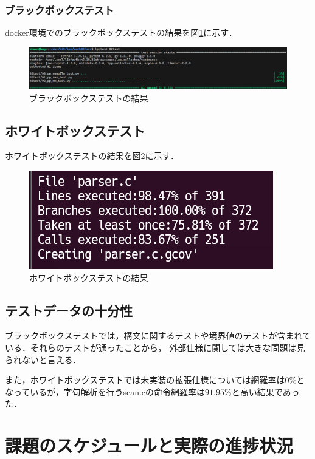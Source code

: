\documentclass{jlreq}
\begin{document}
\subsubsection{ブラックボックステスト}
docker環境でのブラックボックステストの結果を図\ref{fig:black_box_test}に示す．
\begin{figure}[H]
  \centering
  \includegraphics[width=\textwidth]{assets/black_box_test.png}
  \caption{ブラックボックステストの結果}
  \label{fig:black_box_test}
\end{figure}

\subsection{ホワイトボックステスト}
ホワイトボックステストの結果を図\ref{fig:white_box_test}に示す．
\begin{figure}[H]
  \centering
  \includegraphics[width=\textwidth]{assets/white_box_test.png}
  \caption{ホワイトボックステストの結果}
  \label{fig:white_box_test}
\end{figure}

\subsection{テストデータの十分性}
ブラックボックステストでは，構文に関するテストや境界値のテストが含まれている．それらのテストが通ったことから，
外部仕様に関しては大きな問題は見られないと言える．

また，ホワイトボックステストでは未実装の拡張仕様については網羅率は$0\%$となっているが，字句解析を行うscan.cの命令網羅率は$91.95\%$と高い結果であった．

\section{課題のスケジュールと実際の進捗状況}
\end{document}
